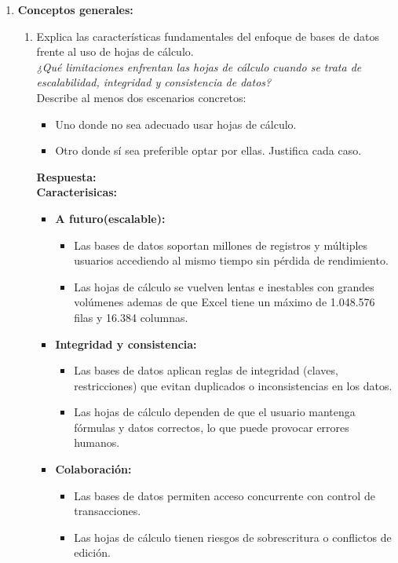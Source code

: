 \documentclass[12pt]{report}
\begin{document}
\begin{enumerate}[label=\textbf{\arabic*.}, leftmargin=*]

\item \textbf{Conceptos generales:}

\begin{enumerate}[label=\textbf{\alph*.}, leftmargin=*, itemsep=1.0em]

\item Explica las caracter\'isticas fundamentales del enfoque de bases de datos frente al uso de hojas de c\'alculo. \\
\textit{¿Qu\'e limitaciones enfrentan las hojas de c\'alculo cuando se trata de escalabilidad, integridad y consistencia de datos?} \\
Describe al menos dos escenarios concretos:
\begin{itemize}
  \item Uno donde no sea adecuado usar hojas de c\'alculo.
  \item Otro donde s\'i sea preferible optar por ellas. Justifica cada caso.
\end{itemize}

    \textbf{Respuesta:}\\
\textbf{Caracterisicas:}
\begin{itemize}
    \item \textbf{A futuro(escalable):}
    \begin{itemize}
        \item Las bases de datos soportan millones de registros y múltiples usuarios accediendo al mismo tiempo sin pérdida de rendimiento.
        \item Las hojas de cálculo se vuelven lentas e inestables con grandes volúmenes ademas de que Excel tiene un máximo de 1.048.576 filas y 16.384 columnas.
    \end{itemize}

    \item \textbf{Integridad y consistencia:}
    \begin{itemize}
        \item Las bases de datos aplican reglas de integridad (claves, restricciones) que evitan duplicados o inconsistencias en los datos.
        \item Las hojas de cálculo dependen de que el usuario mantenga fórmulas y datos correctos, lo que puede provocar errores humanos.
    \end{itemize}

    \item \textbf{Colaboración:}
    \begin{itemize}
        \item Las bases de datos permiten acceso concurrente con control de transacciones.
        \item Las hojas de cálculo tienen riesgos de sobrescritura o conflictos de edición.
    \end{itemize}


\end{itemize}
\end{enumerate}
\end{enumerate}
\end{document}
